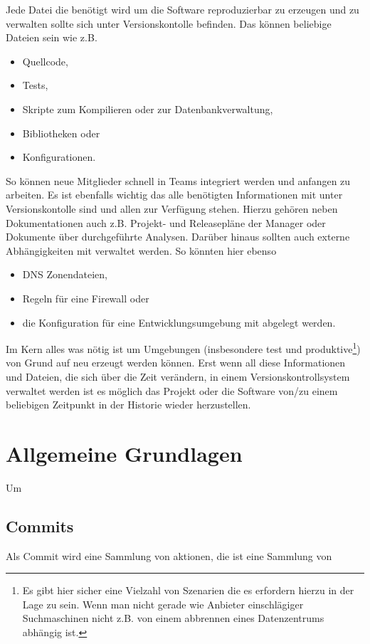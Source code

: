 Jede Datei die benötigt wird um die Software reproduzierbar zu erzeugen und zu
verwalten sollte sich unter Versionskontolle befinden. Das können beliebige
Dateien sein wie z.B.

\begin{itemize}
\item Quellcode,
\item Tests,
\item Skripte zum Kompilieren oder zur Datenbankverwaltung,
\item Bibliotheken oder
\item Konfigurationen.
\end{itemize}

So können neue Mitglieder schnell in Teams integriert werden und anfangen zu
arbeiten. Es ist ebenfalls wichtig das alle benötigten Informationen mit unter
Versionskontolle sind und allen zur Verfügung stehen. Hierzu gehören neben
Dokumentationen auch z.B. Projekt- und Releasepläne der Manager oder Dokumente
über durchgeführte Analysen. Darüber hinaus sollten auch externe Abhängigkeiten
mit verwaltet werden. So könnten hier ebenso

\begin{itemize}
\item DNS Zonendateien,
\item Regeln für eine Firewall oder
\item die Konfiguration für eine Entwicklungsumgebung mit abgelegt werden.
\end{itemize}

Im Kern alles was nötig ist um Umgebungen (insbesondere test und
produktive\footnote{Es gibt hier sicher eine Vielzahl von Szenarien die es
erfordern hierzu in der Lage zu sein. Wenn man nicht gerade wie Anbieter
einschlägiger Suchmaschinen nicht z.B. von einem abbrennen eines Datenzentrums
abhängig ist.}) von Grund auf neu erzeugt werden können. Erst wenn all diese
Informationen und Dateien, die sich über die Zeit verändern, in einem
Versionskontrollsystem verwaltet werden ist es möglich das Projekt oder die
Software von/zu einem beliebigen Zeitpunkt in der Historie wieder herzustellen.
\cite[S.~33]{cd}

\section{Allgemeine Grundlagen}\label{sec:Grundlagen}
Um
\subsection{Commits}
Als Commit wird eine Sammlung von aktionen, die ist eine Sammlung von

